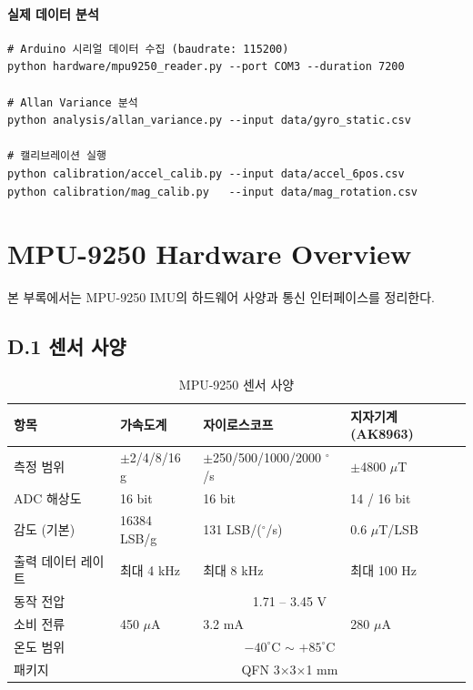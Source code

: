 \paragraph{실제 데이터 분석}
 
\begin{verbatim}
# Arduino 시리얼 데이터 수집 (baudrate: 115200)
python hardware/mpu9250_reader.py --port COM3 --duration 7200
 
# Allan Variance 분석
python analysis/allan_variance.py --input data/gyro_static.csv
 
# 캘리브레이션 실행
python calibration/accel_calib.py --input data/accel_6pos.csv
python calibration/mag_calib.py   --input data/mag_rotation.csv
\end{verbatim}
 
\section{MPU-9250 Hardware Overview}
\label{app:hardware}
 
본 부록에서는 MPU-9250 IMU의 하드웨어 사양과
통신 인터페이스를 정리한다.
 
\subsection*{D.1 센서 사양}
 
\begin{table}[H]
    \centering
    \caption{MPU-9250 센서 사양}
    \label{tab:mpu9250_spec}
    \begin{tabular}{llll}
        \toprule
        항목 & 가속도계 & 자이로스코프 & 지자기계 (AK8963) \\
        \midrule
        측정 범위 & $\pm$2/4/8/16 g & $\pm$250/500/1000/2000 $^\circ$/s & $\pm$4800 $\mu$T \\
        ADC 해상도 & 16 bit & 16 bit & 14 / 16 bit \\
        감도 (기본) & 16384 LSB/g & 131 LSB/($^\circ$/s) & 0.6 $\mu$T/LSB \\
        출력 데이터 레이트 & 최대 4 kHz & 최대 8 kHz & 최대 100 Hz \\
        동작 전압 & \multicolumn{3}{c}{1.71 -- 3.45 V} \\
        소비 전류 & 450 $\mu$A & 3.2 mA & 280 $\mu$A \\
        온도 범위 & \multicolumn{3}{c}{$-40^\circ$C $\sim$ $+85^\circ$C} \\
        패키지 & \multicolumn{3}{c}{QFN 3$\times$3$\times$1 mm} \\
        \bottomrule
    \end{tabular}
\end{table}
 
